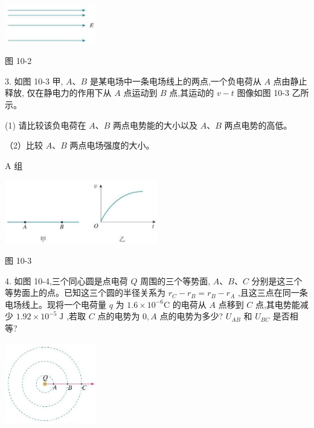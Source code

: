 \documentclass[10pt]{article}
\begin{document}
\begin{center}
\includegraphics[max width=0.3\textwidth]{images/01911d5f-8e38-70c0-b5b8-2b399bd115b6_55_696136.jpg}
\end{center}

图 10-2

3. 如图 10-3 甲, \(A\text{、}B\) 是某电场中一条电场线上的两点,一个负电荷从 \(A\) 点由静止释放, 仅在静电力的作用下从 \(A\) 点运动到 \(B\) 点,其运动的 \(v - t\) 图像如图 10-3 乙所示。

(1) 请比较该负电荷在 \(A\text{、}B\) 两点电势能的大小以及 \(A\text{、}B\) 两点电势的高低。

（2）比较 \(A\text{、}B\) 两点电场强度的大小。

A 组

\begin{center}
\includegraphics[max width=0.5\textwidth]{images/01911d5f-8e38-70c0-b5b8-2b399bd115b6_55_468851.jpg}
\end{center}

图 10-3

4. 如图 10-4,三个同心圆是点电荷 \(Q\) 周围的三个等势面, \(A\text{、}B\text{、}C\) 分别是这三个等势面上的点。已知这三个圆的半径关系为 \({r}_{C} - {r}_{B} = {r}_{B} - {r}_{A}\) ,且这三点在同一条电场线上。现将一个电荷量 \(q\) 为 \({1.6} \times {10}^{-6}\mathrm{C}\) 的电荷从 \(A\) 点移到 \(C\) 点,其电势能减少 \({1.92} \times {10}^{-5}\mathrm{\;J}\) ,若取 \(C\) 点的电势为 \(0,A\) 点的电势为多少? \({U}_{AB}\) 和 \({U}_{BC}\) 是否相等?

\begin{center}
\includegraphics[max width=0.3\textwidth]{images/01911d5f-8e38-70c0-b5b8-2b399bd115b6_55_677327.jpg}
\end{center}
\end{document}
